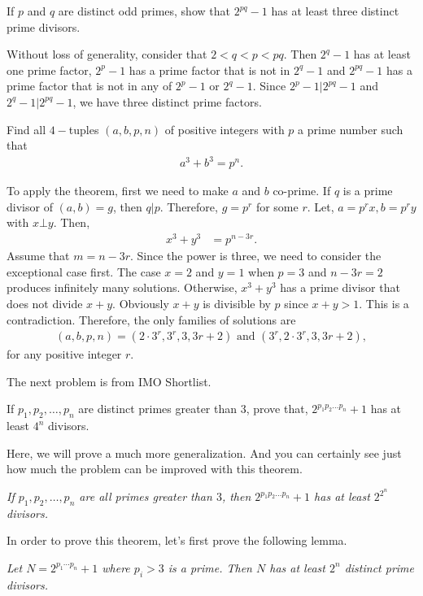 \documentclass{subfile}
\begin{document}
		\begin{problem}
			If $p$ and $q$ are distinct odd primes, show that $2^{pq}-1$ has at least three distinct prime divisors.
		\end{problem}
		
		\begin{solution}
			Without loss of generality, consider that $2<q<p<pq$. Then $2^q-1$ has at least one prime factor, $2^p-1$ has a prime factor that is not in $2^q-1$ and $2^{pq}-1$ has a prime factor that is not in any of $2^p-1$ or $2^q-1$. Since $2^p-1|2^{pq}-1$ and $2^{q}-1|2^{pq}-1$, we have three distinct prime factors.
		\end{solution}
		
		
		\begin{problem}
			Find all $4-$tuples $(a,b,p,n)$ of positive integers with $p$ a prime number such that
				\begin{align*}
					a^3+b^3=p^n.
				\end{align*}
		\end{problem}
		
		\begin{solution}
			To apply the theorem, first we need to make $a$ and $b$ co-prime. If $q$ is a prime divisor of $(a,b)=g$, then $q|p$. Therefore, $g=p^r$ for some $r$. Let, $a=p^rx,b=p^ry$ with $x\bot y$. Then,
				\begin{align*}
					x^3+y^3 & = p^{n-3r}.
				\end{align*}
			Assume that $m=n-3r$. Since the power is three, we need to consider the exceptional case first. The case $x=2$ and $y=1$ when $p=3$ and $n-3r=2$ produces infinitely many solutions. Otherwise, $x^3+y^3$ has a prime divisor that does not divide $x+y$. Obviously $x+y$ is divisible by $p$ since $x+y>1$. This is a contradiction. Therefore, the only families of solutions are
				\begin{align*}
					(a,b,p,n)=(2\cdot 3^r,3^r,3,3r+2) \text{ and }(3^r,2\cdot 3^r,3,3r+2),
				\end{align*}
			for any positive integer $r$.
		\end{solution}
		
	The next problem is from IMO Shortlist.
		\begin{problem}
			If $p_1,p_2,\dots,p_n$ are distinct primes greater than $3$, prove that, $2^{p_1p_2\dots p_n}+1$ has at least $4^n$ divisors.
		\end{problem}
	Here, we will prove a much more generalization. And you can certainly see just how much the problem can be improved with this theorem.
		\begin{theorem}\slshape
			If $p_1,p_2,\dots,p_n$ are all primes greater than $3$, then $2^{p_1p_2\dots p_n}+1$ has at least $2^{2^n}$ divisors.
		\end{theorem}
	In order to prove this theorem, let's first prove the following lemma.
		\begin{lemma}\slshape
			Let $N=2^{p_1\cdots p_n}+1$ where $p_i>3$ is a prime. Then $N$ has at least $2^n$ distinct prime divisors.
		\end{lemma}
		
\end{document}
